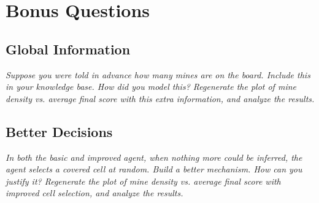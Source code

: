 \documentclass[11pt]{article} %
\begin{document}
\section{\textbf{Bonus Questions}}

\subsection{Global Information}

\textit{Suppose you were told in advance how many mines are on the board. Include this in your knowledge base. How did you model this? Regenerate the plot of mine density vs. average final score with this extra information, and analyze the results.}\\

\subsection{Better Decisions}

\textit{In both the basic and improved agent, when nothing more could be inferred, the agent selects a covered cell at random. Build a better mechanism. How can you justify it? Regenerate the plot of mine density vs. average final score with improved cell selection, and analyze the results.}\\
\end{document}
